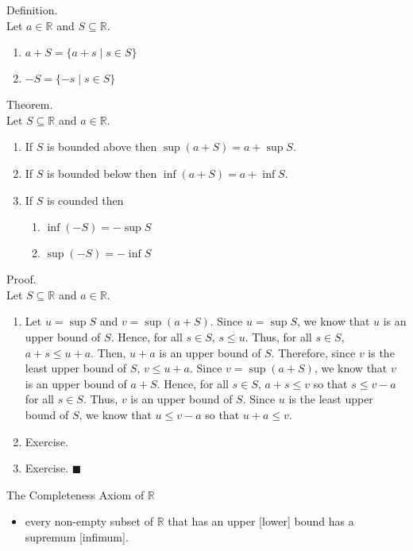 \documentclass[twocolumn]{article}
\newcommand{\qed}{$\blacksquare$}
\newcommand{\br}{\vspace{\baselineskip}}
\newcommand{\reals}{\mathbb{R}}
\begin{document}
Definition. \\
Let $a \in \reals$ and $S \subseteq \reals$.
\begin{enumerate}
	\item
		$a + S = \{a + s \mid s \in S\}$
	\item
		$-S = \{-s \mid s \in S\}$
\end{enumerate} \br

Theorem. \\
Let $S \subseteq \reals$ and $a \in \reals$.
\begin{enumerate}
	\item
		If $S$ is bounded above then $\sup (a + S) = a + \sup S$.
	\item
		If $S$ is bounded below then $\inf (a + S) = a + \inf S$.
	\item
		If $S$ is counded then
		\begin{enumerate}
			\item
				$\inf (-S) = -\sup S$
			\item
				$\sup (-S) = -\inf S$
		\end{enumerate}
\end{enumerate}
Proof. \\
Let $S \subseteq \reals$ and $a \in \reals$.
\begin{enumerate}
	\item
		Let $u = \sup S$ and $v = \sup (a + S)$. Since $u = \sup S$, we know that $u$ is an upper bound of $S$. Hence, for all $s \in S$, $s \leq u$. Thus, for all $s \in S$, $a + s \leq u + a$. Then, $u + a$ is an upper bound of $S$. Therefore, since $v$ is the least upper bound of $S$, $v \leq u + a$. Since $v = \sup (a + S)$, we know that $v$ is an upper bound of $a + S$. Hence, for all $s \in S$, $a + s \leq v$ so that $s \leq v - a$ for all $s \in S$. Thus, $v$ is an upper bound of $S$. Since $u$ is the least upper bound of $S$, we know that $u \leq v - a$ so that $u + a \leq v$.
	\item
		Exercise.
	\item
		Exercise. \qed
\end{enumerate} \br

The Completeness Axiom of $\reals$
\begin{itemize}
	\item
		every non-empty subset of $\reals$ that has an upper [lower] bound has a supremum [infimum].
\end{itemize}
\end{document}
